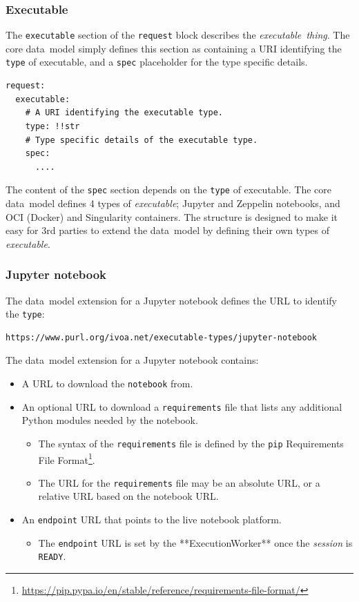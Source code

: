 \documentclass[11pt,a4paper]{ivoa}
\newcommand{\datamodel} {data~model}
\newcommand{\execworkerclass} {**ExecutionWorker**}
\newcommand{\executable} {\textit{executable}}
\newcommand{\executablething}[1] {\textit{executable~thing#1}}
\newcommand{\workerjob}[1] {\textit{session#1}}
\newcommand{\jupyter} {Jupyter}
\newcommand{\jupyternotebook} {Jupyter notebook}
\newcommand{\python} {Python}
\newcommand{\zeppelin} {Zeppelin}
\newcommand{\singularity} {Singularity}
\newcommand{\codeword}[1] {\texttt{#1}}
\newcommand{\footurl}[1] {\footnote{\url{#1}}}
\begin{document}
\subsubsection{Executable}
\label{subsub-datamodel-executable}

The \codeword{executable} section of the \codeword{request} block describes the \executablething{}.
The core \datamodel{} simply defines this section as containing a URI identifying the \codeword{type} of executable,
and a \codeword{spec} placeholder for the type specific details.

\begin{lstlisting}[]
request:
  executable:
    # A URI identifying the executable type.
    type: !!str
    # Type specific details of the executable type.
    spec:
      ....
\end{lstlisting}

The content of the \codeword{spec} section depends on the \codeword{type} of executable.
The core \datamodel{} defines 4 types of \executable{};
\jupyter{} and \zeppelin{} notebooks, and OCI (Docker) and \singularity{} containers.
The structure is designed to make it easy for 3rd parties to extend the \datamodel{}
by defining their own types of \executable{}.

\subsubsection{Jupyter notebook}
\label{subsub-datamodel-jupyter-notebook}

The \datamodel{} extension for a \jupyternotebook{} defines the URL
to identify the \codeword{type}:
\begin{lstlisting}[]
https://www.purl.org/ivoa.net/executable-types/jupyter-notebook
\end{lstlisting}
\hfill \break
The \datamodel{} extension for a \jupyternotebook{} contains:
\begin{itemize}
    \item A URL to download the \codeword{notebook} from.
    \item An optional URL to download a \codeword{requirements} file that lists any additional
    \python{} modules needed by the notebook.
    \begin{itemize}
        \item The syntax of the \codeword{requirements} file is defined by the \codeword{pip}
        Requirements File Format\footurl{https://pip.pypa.io/en/stable/reference/requirements-file-format/}.
        \item The URL for the \codeword{requirements} file may be an absolute URL, or a relative URL based on the notebook URL.
    \end{itemize}
    \item An \codeword{endpoint} URL that points to the live notebook platform.
    \begin{itemize}
        \item The \codeword{endpoint} URL is set by the \execworkerclass{} once the \workerjob{} is \codeword{READY}.
    \end{itemize}
\end{itemize}
\end{document}
